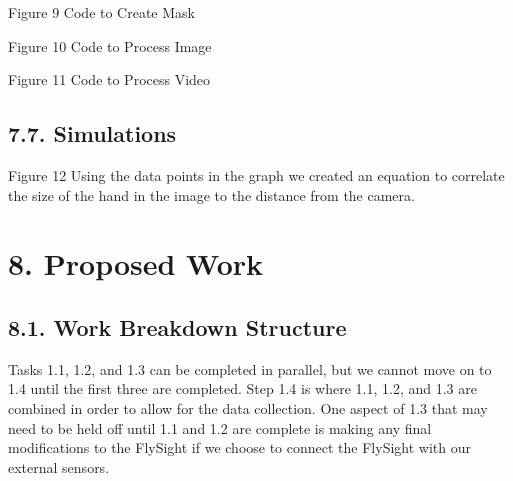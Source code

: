 \documentclass[10pt]{article}
\begin{document}

Figure 9 Code to Create Mask

Figure 10 Code to Process Image

Figure 11 Code to Process Video

\subsection{7.7. Simulations}

Figure 12 Using the data points in the graph we created an equation to correlate the size of the hand in the image to the distance from the camera.

\section{8. Proposed Work}

\subsection{8.1. Work Breakdown Structure}


Tasks 1.1, 1.2, and 1.3 can be completed in parallel, but we cannot move on to 1.4 until the first three are completed. Step 1.4 is where 1.1, 1.2, and 1.3 are combined in order to allow for the data collection. One aspect of 1.3 that may need to be held off until 1.1 and 1.2 are complete is making any final modifications to the FlySight if we choose to connect the FlySight with our external sensors.
\end{document}
